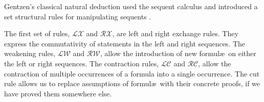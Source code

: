   Gentzen's classical natural deduction used the sequent calculus and introduced a set structural rules for manipulating sequents \cite{Groote94}.
  
  
  The first set of rules, $\mathcal{LX}$ and $\mathcal{RX}$, are left and right exchange rules. 
  They express the commutativity of statements in the left and right sequences.
  The weakening rules, $\mathcal{LW}$ and $\mathcal{RW}$, allow the introduction of new formul\ae\ on either the left or right sequences.
  The contraction rules, $\mathcal{LC}$ and $\mathcal{RC}$, allow the contraction of multiple occurrences of a formula into a single occurrence. 
  The cut rule allows us to replace assumptions of formul\ae\ with their concrete proofs, if we have proved them somewhere else.
  
